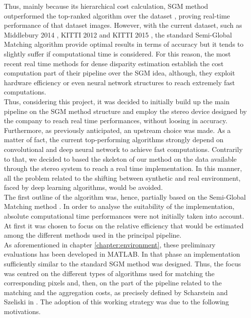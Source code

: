 Thus, mainly because its hierarchical cost calculation, SGM method outperformed the top-ranked algorithm over the dataset \cite{scharstein2003high}, proving real-time performance of that dataset images. 
However, with the current dataset, such as Middlebury 2014 \cite{Scharstein2014}, KITTI 2012 \cite{geiger2013vision} and KITTI 2015 \cite{menze2015object}, the standard Semi-Global Matching algorithm provide optimal results in terms of accuracy but it tends to slightly suffer if computational time is considered.
For this reason, the most recent real time methods for dense disparity estimation establish the cost computation part of their pipeline over the SGM idea, although, they exploit hardware efficiency or even neural network structures to reach extremely fast computations.\\
Thus, considering this project, it was decided to initially build up the main pipeline on the SGM method structure and employ the stereo device designed by the company to reach real time performances, without loosing in accuracy. 
Furthermore, as previously anticipated, an upstream choice was made. 
As a matter of fact, the current top-performing algorithms strongly depend on convolutional and deep neural network to achieve fast computations.
Contrarily to that, we decided to based the skeleton of our method on the data available through the stereo system to reach a real time implementation.
In this manner, all the problem related to the shifting between synthetic and real environment, faced by deep learning algorithms, would be avoided. \\
The first outline of the algorithm was, hence, partially based on the Semi-Global Matching method \cite{Hirschmuller2008}. 
In order to analyse the suitability of the implementation, absolute computational time performances were not initially taken into account. 
At first it was chosen to focus on the relative efficiency that would be estimated among the different methods used in the principal pipeline.\\
As aforementioned in chapter \ref{chapter:environment}, these preliminary evaluations has been developed in MATLAB. 
In that phase an implementation sufficiently similar to the standard SGM method was designed. 
Thus, the focus was centred on the different types of algorithms used for matching the corresponding pixels and, then, on the part of the pipeline related to the matching and the aggregation costs, as precisely defined by Scharstein and Szeliski in \cite{Scharstein2001}.
The adoption of this working strategy was due to the following motivations. 
